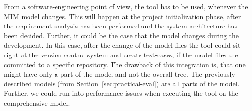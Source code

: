 From a software-engineering point of view, the tool has to be used, whenever the MIM model changes. 
This will happen at the project initialization phase, after the requirement analysis has been performed and the system architecture has been decided. 
Further, it could be the case that the model changes during the development. In this case, after the change of the model-files the tool could sit right at the version control system and create test-cases, if the model files are committed to a specific repository. 
The drawback of this integration is, that one might have only a part of the model and not the overall tree.
The previously described models (from Section~\ref{sec:practical-eval}) are all parts of the model. Further, we could run into performance issues when executing the tool on the comprehensive model.

%
